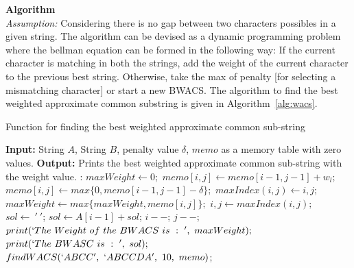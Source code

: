 \documentclass{article}
\begin{document}
\textbf{Algorithm} \\
\textit{Assumption:} Considering there is no gap between two characters possibles in a given string.
The algorithm can be devised as a dynamic programming problem where the bellman equation can be formed in the following way:
If the current character is matching in both the strings, add the weight of the current character to the previous best string. Otherwise, take the max of penalty  [for selecting a mismatching character] or start a new BWACS. The algorithm to find the best weighted approximate common substring is given in Algorithm~\ref{alg:wacs}.\\
\begin{algorithm}[ht]
\caption{Function for finding the best weighted approximate common sub-string}
\label{alg:wacs}
\begin{algorithmic}[1]
\State \textbf{Input:} String $A$, String $B$, penalty value $\delta$, $memo$ as a memory table with zero values.
\State \textbf{Output:} Prints the best weighted approximate common sub-string with the weight value.
:
\State $maxWeight\leftarrow0;$
 \State $memo[i,j] \leftarrow memo[i-1, j-1]+w_l;$ 
 \Else 
 \State $memo[i,j] \leftarrow max\{0, memo[i-1,j-1]-\delta\};$
 \State $maxIndex(i,j) \leftarrow i,j;$ 
 \State $maxWeight \leftarrow max\{maxWeight, memo[i,j]\};$
 \EndIf
\EndFor
\EndFor
\State $i,j \leftarrow maxIndex(i,j);$
\State $sol \leftarrow\ '\ '$;
\State $sol \leftarrow A[i-1]+sol$;
\State $i--$;
\State $j--$;
\EndWhile
\State $print(\lq The\ Weight\ of\ the\ BWACS\ is\ :\ \rq,\ maxWeight);$
\State $print(\lq The\ BWASC\ is\ :\ \rq,\ sol);$
\EndFunction
\State $findWACS(\lq ABCC \rq,\ \lq ABCCDA\rq,\ 10,\ memo)$;
\end{algorithmic}
\end{algorithm}
\end{document}
